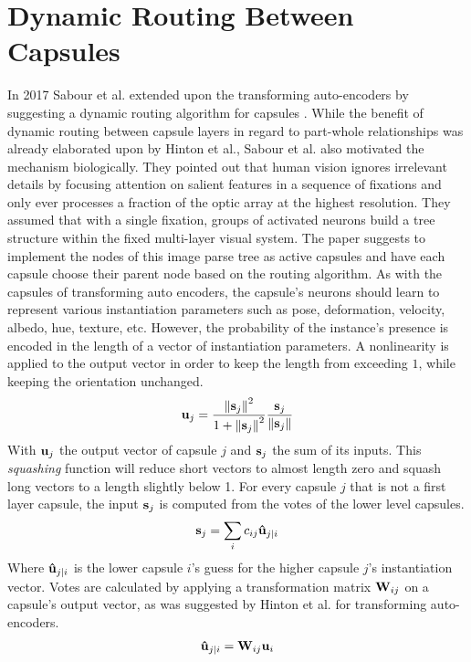 \section{Dynamic Routing Between Capsules}
In 2017 Sabour et al. extended upon the transforming auto-encoders by suggesting a dynamic routing algorithm for capsules \cite{sabour2017dynamic}. While the benefit of dynamic routing between capsule layers in regard to part-whole relationships was already elaborated upon by Hinton et al., Sabour et al. also motivated the mechanism biologically. They pointed out that human vision ignores irrelevant details by focusing attention on salient features in a sequence of fixations and only ever processes a fraction of the optic array at the highest resolution. They assumed that with a single fixation, groups of activated neurons build a tree structure within the fixed multi-layer visual system. The paper suggests to implement the nodes of this image parse tree as active capsules and have each capsule choose their parent node based on the routing algorithm. As with the capsules of transforming auto encoders, the capsule's neurons should learn to represent various instantiation parameters such as pose, deformation, velocity, albedo, hue, texture, etc. However, the probability of the instance's presence is encoded in the length of a vector of instantiation parameters. A nonlinearity is applied to the output vector in order to keep the length from exceeding $\num{1}$, while keeping the orientation unchanged.
\begin{align}
    \vb{u}_j = \frac{\norm{\vb{s}_j}^2}{1+\norm{\vb{s}_j}^2}\frac{\vb{s}_j}{\norm{\vb{s}_j}}
    \label{eq:squash}
\end{align}
With $\vb{u}_j$ the output vector of capsule $j$ and $\vb{s}_j$ the sum of its inputs. This \emph{squashing} function will reduce short vectors to almost length zero and squash long vectors to a length slightly below 1. For every capsule $j$ that is not a first layer capsule, the input $\vb{s}_j$ is computed from the votes of the lower level capsules.
\begin{align}
    \vb{s}_j = \sum_i c_{ij} \vb{\hat{u}}_{j|i}
\end{align}
Where $\vb{\hat{u}}_{j|i}$ is the lower capsule $i$'s guess for the higher capsule $j$'s instantiation vector. Votes are calculated by applying a transformation matrix $\vb{W}_{ij}$ on a capsule's output vector, as was suggested by Hinton et al. for transforming auto-encoders.
\begin{align}
    \vb{\hat{u}}_{j|i} = \vb{W}_{ij}\vb{u}_i
\end{align}
